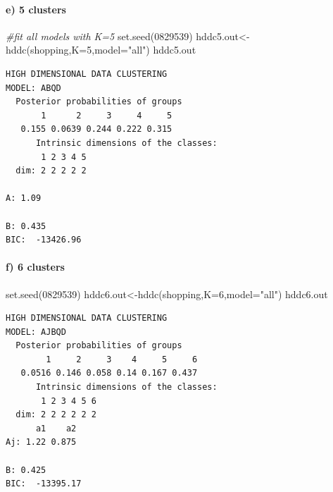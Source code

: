 \documentclass[
  11pt,
]{article}
\newenvironment{Shaded}{\begin{snugshade}}{\end{snugshade}}
\newcommand{\AttributeTok}[1]{\textcolor[rgb]{0.77,0.63,0.00}{#1}}
\newcommand{\CommentTok}[1]{\textcolor[rgb]{0.56,0.35,0.01}{\textit{#1}}}
\newcommand{\DecValTok}[1]{\textcolor[rgb]{0.00,0.00,0.81}{#1}}
\newcommand{\FunctionTok}[1]{\textcolor[rgb]{0.00,0.00,0.00}{#1}}
\newcommand{\NormalTok}[1]{#1}
\newcommand{\OtherTok}[1]{\textcolor[rgb]{0.56,0.35,0.01}{#1}}
\newcommand{\StringTok}[1]{\textcolor[rgb]{0.31,0.60,0.02}{#1}}
\begin{document}
\hypertarget{e-5-clusters}{%
\paragraph{e) 5 clusters}\label{e-5-clusters}}

\begin{Shaded}
\begin{Highlighting}[]
\CommentTok{\#fit all models with K=5}
\FunctionTok{set.seed}\NormalTok{(}\DecValTok{0829539}\NormalTok{)}
\NormalTok{hddc5.out}\OtherTok{\textless{}{-}}\FunctionTok{hddc}\NormalTok{(shopping,}\AttributeTok{K=}\DecValTok{5}\NormalTok{,}\AttributeTok{model=}\StringTok{"all"}\NormalTok{)}
\NormalTok{hddc5.out}
\end{Highlighting}
\end{Shaded}

\begin{verbatim}
HIGH DIMENSIONAL DATA CLUSTERING
MODEL: ABQD
  Posterior probabilities of groups
       1      2     3     4     5
   0.155 0.0639 0.244 0.222 0.315
      Intrinsic dimensions of the classes:
       1 2 3 4 5
  dim: 2 2 2 2 2
       
A: 1.09
        
B: 0.435
BIC:  -13426.96 
\end{verbatim}

\hypertarget{f-6-clusters}{%
\paragraph{f) 6 clusters}\label{f-6-clusters}}

\begin{Shaded}
\begin{Highlighting}[]
\FunctionTok{set.seed}\NormalTok{(}\DecValTok{0829539}\NormalTok{)}
\NormalTok{hddc6.out}\OtherTok{\textless{}{-}}\FunctionTok{hddc}\NormalTok{(shopping,}\AttributeTok{K=}\DecValTok{6}\NormalTok{,}\AttributeTok{model=}\StringTok{"all"}\NormalTok{)}
\NormalTok{hddc6.out}
\end{Highlighting}
\end{Shaded}

\begin{verbatim}
HIGH DIMENSIONAL DATA CLUSTERING
MODEL: AJBQD
  Posterior probabilities of groups
        1     2     3    4     5     6
   0.0516 0.146 0.058 0.14 0.167 0.437
      Intrinsic dimensions of the classes:
       1 2 3 4 5 6
  dim: 2 2 2 2 2 2
      a1    a2
Aj: 1.22 0.875
        
B: 0.425
BIC:  -13395.17 
\end{verbatim}
\end{document}
